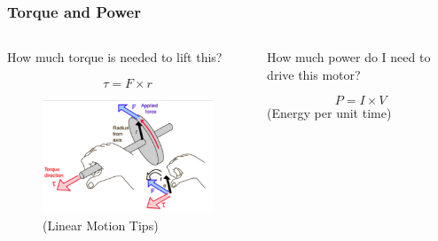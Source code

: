 \documentclass[compress, aspectratio=32]{beamer}
\begin{document}
\begin{frame}
    \frametitle{Torque and Power}
    \begin{columns}
        \begin{column}[]{0.5\textwidth}
            How much torque is needed to lift this?
            \begin{theorem}[Torque]
        \begin{equation*}
            \tau = F \times r
        \end{equation*}
        
    \end{theorem}
    
    \begin{figure}
        \centering
        \includegraphics[height=0.3\textheight]{what-is-torque-300x199.jpg}
        \caption*{(Linear Motion Tips)}
    \end{figure}
    
        \end{column}
        \begin{column}[]{0.5\textwidth}
            How much power do I need to drive this motor?
            \begin{theorem}[Power]
                \begin{equation*}
                    P = I \times V
                \end{equation*}
                (Energy per unit time)
            \end{theorem}
            
        \end{column}
    \end{columns}
    
\end{frame}
\end{document}
